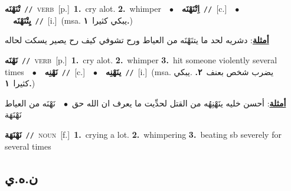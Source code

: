 \documentclass[10pt,a4paper,twoside]{article} %
\begin{document}
\begin{multicols}{2}
{\setlength\topsep{0pt}\textbf{\foreignlanguage{arabic}{تْنَهْنَه}}\ {\color{gray}\texttt{//}\color{black}}\ \textsc{verb}\ [p.]\ \textbf{1.}~cry alot.  \textbf{2.}~whimper\ \ $\bullet$\ \ \setlength\topsep{0pt}\textbf{\foreignlanguage{arabic}{اِتْنَهْنَه}}\ {\color{gray}\texttt{//}\color{black}}\ [c.]\ \ $\bullet$\ \ \setlength\topsep{0pt}\textbf{\foreignlanguage{arabic}{يِتْنَهْنَه}}\ {\color{gray}\texttt{//}\color{black}}\ [i.]\ \color{gray}(msa. \foreignlanguage{arabic}{يبكي كثيرا}~\foreignlanguage{arabic}{\textbf{١.}})\color{black}\  \begin{flushright}\color{gray}\foreignlanguage{arabic}{\textbf{\underline{\foreignlanguage{arabic}{أمثلة}}}: دشريه لحد ما يتنَهْنَه من العياط ورح تشوفي كيف رح يصير يسكت لحاله}\end{flushright}\color{black}} \vspace{2mm}

{\setlength\topsep{0pt}\textbf{\foreignlanguage{arabic}{نَهْنَه}}\ {\color{gray}\texttt{//}\color{black}}\ \textsc{verb}\ [p.]\ \textbf{1.}~cry alot.  \textbf{2.}~whimper  \textbf{3.}~hit someone violently several times\ \ $\bullet$\ \ \setlength\topsep{0pt}\textbf{\foreignlanguage{arabic}{نَهْنِه}}\ {\color{gray}\texttt{//}\color{black}}\ [c.]\ \ $\bullet$\ \ \setlength\topsep{0pt}\textbf{\foreignlanguage{arabic}{ينَهْنِه}}\ {\color{gray}\texttt{//}\color{black}}\ [i.]\ \color{gray}(msa. \foreignlanguage{arabic}{يضرب شخص بعنف}~\foreignlanguage{arabic}{\textbf{٢.}}  .\foreignlanguage{arabic}{يبكي كثيرا}~\foreignlanguage{arabic}{\textbf{١.}})\color{black}\  \begin{flushright}\color{gray}\foreignlanguage{arabic}{\textbf{\underline{\foreignlanguage{arabic}{أمثلة}}}: أحسن خليه ينَهْنِهُه من القتل لحدِّيت ما يعرف ان الله حق\ $\bullet$\ \  نَهْنَه من العياط نَهْنَهَة}\end{flushright}\color{black}} \vspace{2mm}

{\setlength\topsep{0pt}\textbf{\foreignlanguage{arabic}{نَهْنَهَة}}\ {\color{gray}\texttt{//}\color{black}}\ \textsc{noun}\ [f.]\ \textbf{1.}~crying a lot.  \textbf{2.}~whimpering  \textbf{3.}~beating sb severely for several times\ } \vspace{2mm}

\vspace{-3mm}
\subsection*{\color{blue}\foreignlanguage{arabic}{ن.ه.ي}\color{blue}{}} 


\end{multicols}
\end{document}
